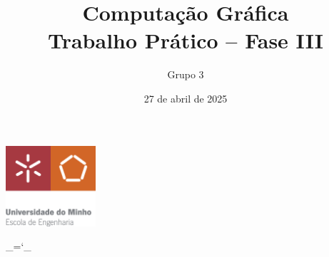 \documentclass[12pt, a4paper]{article}
\title{\Huge \textbf{Computação Gráfica \\ \Large Trabalho Prático -- Fase III}}
\date{27 de abril de 2025}
\author{Grupo 3}
\begin{document}
\begin{center}
    \includegraphics[width=0.25\textwidth]{res/cover/EE-C.eps}
\end{center}

\chardef\_=`_
\onehalfspacing
\setlength{\parskip}{\baselineskip}
\setlength{\parindent}{0pt}
\def\arraystretch{1.5}

{\let\newpage\relax\maketitle}
\maketitle
\thispagestyle{empty}

\vspace*{\fill}
\end{document}
